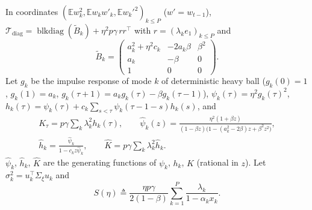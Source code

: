 \documentclass[11pt]{article}
\theoremstyle{remark}
\newcommand{\E}{\mathbb{E}}
\newcommand{\T}{\mathcal T}
\begin{document}
In coordinates $(\E w_k^2,\E w_kw'_k,\E w_k'^2)_{k\le P}$ ($w'=w_{t-1}$), $\T_{\mathrm{diag}}=\operatorname{blkdiag}(\widetilde B_k)+\eta^2p\gamma\,rr^\top$ with $r=(\lambda_ke_1)_{k\le P}$ and
\[
\widetilde B_k=\begin{pmatrix}a_k^2+\eta^2c_k&-2a_k\beta&\beta^2\\ a_k&-\beta&0\\ 1&0&0\end{pmatrix}.
\]
Let $g_k$ be the impulse response of mode $k$ of deterministic heavy ball ($g_k(0)=1$, $g_k(1)=a_k$, $g_k(\tau+1)=a_kg_k(\tau)-\beta g_k(\tau-1)$), $\psi_k(\tau)=\eta^2g_k(\tau)^2$, $h_k(\tau)=\psi_k(\tau)+c_k\sum_{s<\tau}\psi_k(\tau-1-s)h_k(s)$, and
\[
\begin{gathered}
K_\tau=p\gamma\sum_k\lambda_k^2h_k(\tau),\qquad \widehat\psi_k(z)=\frac{\eta^2(1+\beta z)}{(1-\beta z)\big(1-(a_k^2-2\beta)z+\beta^2z^2\big)},\\ \widehat h_k=\frac{\widehat\psi_k}{1-c_kz\widehat\psi_k},\qquad \widehat K=p\gamma\sum_k\lambda_k^2\widehat h_k .
\end{gathered}
\]
$\widehat\psi_k$, $\widehat h_k$, $\widehat K$ are the generating functions of $\psi_k$, $h_k$, $K$ (rational in $z$). Let $\sigma_k^2=u_k^\top\Sigma_\xi u_k$ and
\[
S(\eta)\triangleq\frac{\eta p\gamma}{2(1-\beta)}\sum_{k=1}^P\frac{\lambda_k}{1-\alpha_kx_k}.
\]
\end{document}
